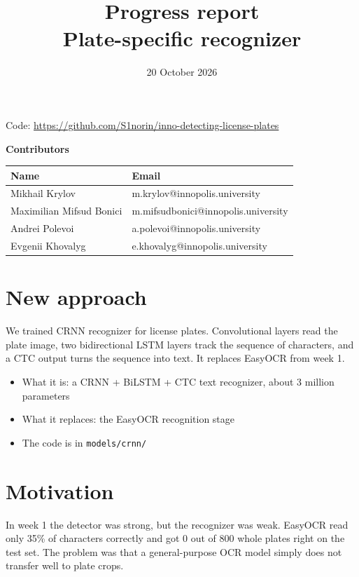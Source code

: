 \documentclass[11pt]{article}
\title{Progress report\\ \large Plate-specific recognizer}
\date{20 October 2026}
\begin{document}
\maketitle

\noindent Code: \url{https://github.com/S1norin/inno-detecting-license-plates}

\bigskip
\textbf{Contributors}

\begin{center}
\begin{tabular}{@{}ll@{}}
\toprule
Name & Email \\
\midrule
Mikhail Krylov & m.krylov@innopolis.university \\
Maximilian Mifsud Bonici & m.mifsudbonici@innopolis.university \\
Andrei Polevoi & a.polevoi@innopolis.university \\
Evgenii Khovalyg & e.khovalyg@innopolis.university \\
\bottomrule
\end{tabular}
\end{center}

\section{New approach}

We trained CRNN recognizer for license plates. Convolutional layers read the
plate image, two bidirectional LSTM layers track the sequence of characters,
and a CTC output turns the sequence into text. It replaces EasyOCR from
week 1.

\begin{itemize}
\item What it is: a CRNN + BiLSTM + CTC text recognizer, about 3 million
  parameters
\item What it replaces: the EasyOCR recognition stage
\item The code is in \texttt{models/crnn/}
\end{itemize}

\section{Motivation}

In week 1 the detector was strong, but the recognizer was weak. EasyOCR read
only 35\% of characters correctly and got 0 out of 800 whole plates right on
the test set. The problem was that a general-purpose OCR model simply does
not transfer well to plate crops.
\end{document}
